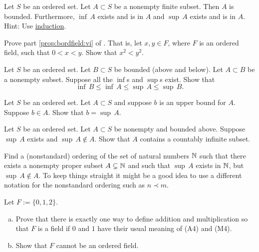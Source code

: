 \begin{exercise} \label{exercise:finitesethasminmax}
Let $S$ be an ordered set.  Let $A \subset S$ be a nonempty finite subset.
Then $A$ is bounded.  Furthermore,
$\inf\, A$ exists and is in $A$ and 
$\sup\, A$ exists and is in $A$.  Hint: Use
\hyperref[induction:thm]{induction}.
\end{exercise}

\begin{exercise} \label{exercise:squareineq}
Prove part \ref{prop:bordfield:vi} of .
That is, let $x, y \in F$, where $F$ is an ordered field, such that
$0 < x < y$.  Show that $x^2 < y^2$.
\end{exercise}

\begin{exercise}
Let $S$ be an ordered set.  Let $B \subset S$ be bounded (above and
below).  Let $A \subset B$ be a nonempty subset.
Suppose all the $\inf$s and
$\sup$s exist. Show that
\begin{equation*}
\inf\, B \leq \inf\, A \leq \sup\, A \leq \sup\, B .
\end{equation*}
\end{exercise}

\begin{exercise}
Let $S$ be an ordered set.  Let $A \subset S$ and suppose 
$b$ is an upper bound for $A$.  Suppose $b \in A$.  Show
that $b = \sup\, A$.
\end{exercise}

\begin{exercise}
Let $S$ be an ordered set.  Let $A \subset S$ be nonempty and
bounded above.
Suppose $\sup\, A$ exists and
$\sup\, A \notin A$.
Show that $A$ contains a countably infinite
subset.
\end{exercise}

\begin{exercise}
Find a (nonstandard) ordering of the set of natural numbers ${\mathbb{N}}$
such that there exists a nonempty proper subset $A \subsetneq {\mathbb{N}}$
and such that $\sup\, A$ exists in ${\mathbb{N}}$, but $\sup\, A \notin A$.
To keep things straight it might be a good idea to use a different
notation for the nonstandard ordering such as $n \prec m$.
\end{exercise}

\begin{exercise}
Let $F := \{ 0, 1, 2 \}$.
\begin{enumerate}[a)]
\item
Prove that there is
exactly one way to define addition and multiplication so that $F$ is
a field if $0$ and $1$ have their usual meaning of (A4) and (M4).
\item
Show that $F$ cannot be an ordered field.
\end{enumerate}
\end{exercise}

